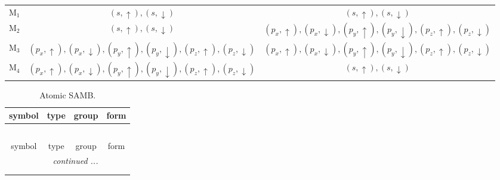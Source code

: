 \documentclass[fleqn,10pt,landscape]{article}
\begin{document}
\begin{itemize}
\begin{center}
\begin{longtable}{c|c|c}
M$_{1}$ & $(s,\uparrow), (s,\downarrow)$ & $(s,\uparrow), (s,\downarrow)$ \\
M$_{2}$ & $(s,\uparrow), (s,\downarrow)$ & $(p_{x},\uparrow), (p_{x},\downarrow), (p_{y},\uparrow), (p_{y},\downarrow), (p_{z},\uparrow), (p_{z},\downarrow)$ \\
M$_{3}$ & $(p_{x},\uparrow), (p_{x},\downarrow), (p_{y},\uparrow), (p_{y},\downarrow), (p_{z},\uparrow), (p_{z},\downarrow)$ & $(p_{x},\uparrow), (p_{x},\downarrow), (p_{y},\uparrow), (p_{y},\downarrow), (p_{z},\uparrow), (p_{z},\downarrow)$ \\
M$_{4}$ & $(p_{x},\uparrow), (p_{x},\downarrow), (p_{y},\uparrow), (p_{y},\downarrow), (p_{z},\uparrow), (p_{z},\downarrow)$ & $(s,\uparrow), (s,\downarrow)$ \\
\end{longtable}
\end{center}
\begin{center}
\renewcommand{\arraystretch}{1.3}
\begin{longtable}{c|c|c|c}
\caption{Atomic SAMB.}
 \\
 \hline \hline
symbol & type & group & form \\ \hline \endfirsthead

\multicolumn{3}{l}{\tablename\ \thetable{}} \\
 \hline \hline
symbol & type & group & form \\ \hline \endhead

 \hline \hline
\multicolumn{3}{r}{\footnotesize\it continued ...} \\ \endfoot

 \hline \hline
\multicolumn{3}{r}{} \\ \endlastfoot


\end{longtable}
\end{center}
\end{itemize}
\end{document}
